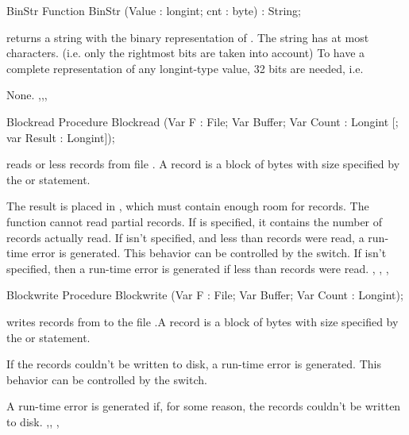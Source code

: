 \begin{function}{BinStr}
\Declaration
Function BinStr (Value : longint; cnt : byte) : String;

\Description
{} returns a string with the binary representation
of . The string has at most  characters.
(i.e. only the  rightmost bits are taken into account)
To have a complete representation of any longint-type value, 32
bits are needed, i.e. 

\Errors
None.
\SeeAlso
{},,, 
\end{function}


\begin{procedure}{Blockread}
\Declaration
Procedure Blockread (Var F : File; Var Buffer; Var Count : Longint [; var
Result : Longint]);

\Description
{} reads  or less records from file . A
record is a block of bytes with size specified by the  or
 statement.

The result is placed in , which must contain enough room for
 records. The function cannot read partial records.
If  is specified, it contains the number of records actually
read. If  isn't specified, and less than  records were
read, a run-time error is generated. This behavior can be controlled by the
 switch.
\Errors
If  isn't specified, then a run-time error is generated if less
than  records were read.
\SeeAlso
{}, , , 
\end{procedure}


\begin{procedure}{Blockwrite}
\Declaration
Procedure Blockwrite (Var F : File; Var Buffer; Var Count : Longint);

\Description
{} writes  records from  to the file
 .A record is a block of bytes with size specified by the  or
 statement.

If the records couldn't be written to disk, a run-time error is generated.
This behavior can be controlled by the  switch.

\Errors
A run-time error is generated if, for some reason, the records couldn't be
written to disk.
\SeeAlso
{},, , 
\end{procedure}

